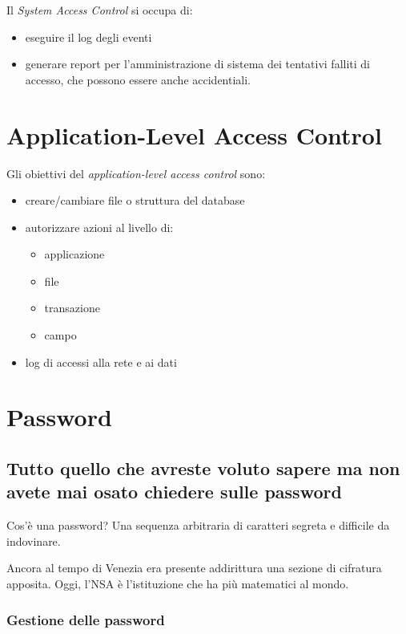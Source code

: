 Il \textit{System Access Control} si occupa di:
\begin{itemize}
 \item eseguire il log degli eventi
 \item generare report per l'amministrazione di sistema dei tentativi falliti
di accesso, che possono essere anche accidentiali.
\end{itemize}

\section{Application-Level Access Control}

Gli obiettivi del \textit{application-level access control} sono:
\begin{itemize}
 \item creare/cambiare file o struttura del database
 \item autorizzare azioni al livello di:
  \begin{itemize}
   \item applicazione
   \item file
   \item transazione
   \item campo
  \end{itemize}
\item log di accessi alla rete e ai dati
\end{itemize}

\section{Password}
\label{Password}

\subsection{Tutto quello che avreste voluto sapere ma non avete mai osato
chiedere sulle password}

Cos'è una password? Una sequenza arbitraria di caratteri segreta e difficile da
indovinare.

Ancora al tempo di Venezia era presente addirittura una sezione di cifratura
apposita. Oggi, l'NSA è l'istituzione che ha più matematici al mondo.

\subsubsection{Gestione delle password}

